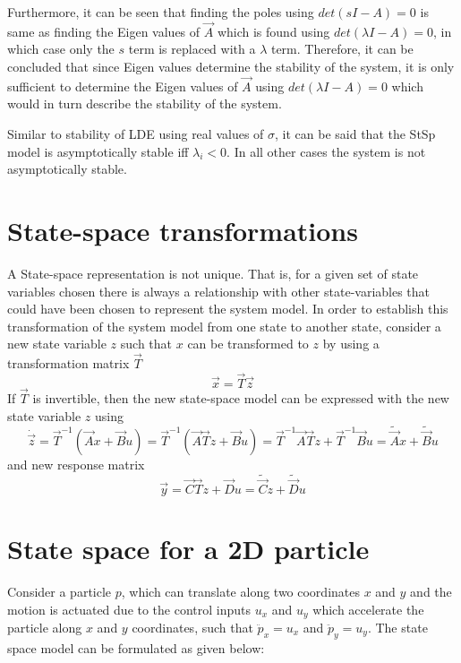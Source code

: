 Furthermore, it can be seen that finding the poles using $det(sI - A) = 0$ is same as finding the Eigen values of $\vec{A}$ which is found using $det(\lambda I - A) = 0$, in which case only the $s$ term is replaced with a $\lambda$ term. Therefore, it can be concluded that since Eigen values determine the stability of the system, it is only sufficient to determine the Eigen values of $\vec{A}$ using $det(\lambda I - A) = 0$ which would in turn describe the stability of the system.

Similar to stability of LDE using real values of $\sigma$, it can be said that the StSp model is asymptotically stable iff $\lambda_{i} < 0$. In all other cases the system is not asymptotically stable.

\section{State-space transformations}

A State-space representation is not unique. That is, for a given set of state variables chosen there is always a relationship with other state-variables that could have been chosen to represent the system model. In order to establish this transformation of the system model from one state to another state, consider a new state variable $z$ such that $x$ can be transformed to $z$ by using a transformation matrix $\vec{T}$
\begin{equation}
	\vec{x} = \vec{T} \vec{z}
\end{equation}
If $\vec{T}$ is invertible, then the new state-space model can be expressed with the new state variable $z$ using
\begin{equation}
	\dot{\vec{z}} = \vec{T}^{-1}(\vec{A}x + \vec{B}u) = \vec{T}^{-1}(\vec{A}\vec{T}z + \vec{B}u) = \vec{T}^{-1} \vec{A}\vec{T}z + \vec{T}^{-1} \vec{B}u = \tilde{\vec{A}}x + \tilde{\vec{B}}u
\end{equation}
and new response matrix
\begin{equation}
	\vec{y} = \vec{C}\vec{T}z + \vec{D}u = \tilde{\vec{C}}z + \tilde{\vec{D}}u
\end{equation}

\section{State space for a 2D particle}

Consider a particle $p$, which can translate along two coordinates $x$ and $y$ and the motion is actuated due to the control inputs $u_x$ and $u_y$ which accelerate the particle along $x$ and $y$ coordinates, such that $\ddot{p}_{x} = u_x$ and $\ddot{p}_{y} = u_y$. The state space model can be formulated as given below:

